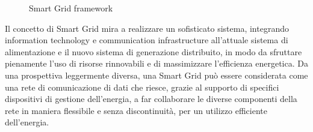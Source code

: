 \begin{figure}[h] 
\caption{Smart Grid framework}\label{fig:3}
\end{figure}

\newpage
Il concetto di Smart Grid mira a realizzare un sofisticato sistema, integrando information technology e communication infrastructure all'attuale sistema di alimentazione e il nuovo sistema di generazione distribuito, in modo da sfruttare pienamente l'uso di risorse rinnovabili e di massimizzare l'efficienza energetica. Da una prospettiva leggermente diversa, una Smart Grid può essere considerata come una rete di comunicazione di dati che riesce, grazie al supporto di specifici dispositivi di gestione dell'energia, a far collaborare le diverse componenti della rete in maniera flessibile e senza discontinuità, per un utilizzo efficiente dell'energia.

